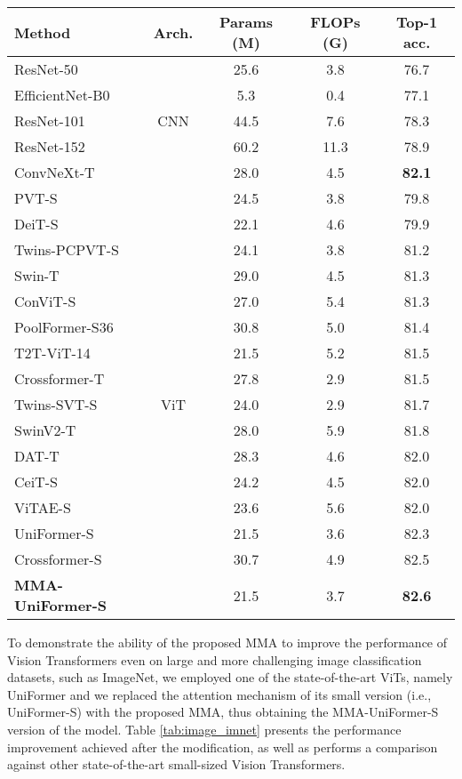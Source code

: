 \documentclass[10pt,twocolumn,letterpaper]{article}
\begin{document}
\begin{table*}[t]
\centering
\caption{Comparative evaluation on ImageNet with images of size $224\times224$.}
\label{tab:image_imnet}
\setlength{\tabcolsep}{24pt}
\begin{tabular}{lcccc}
\hline
\textbf{Method}  & \textbf{Arch.} & \textbf{Params (M)} & \textbf{FLOPs (G)} & \textbf{Top-1 acc.}\\
\hline
ResNet-50 \cite{Author61} & & 25.6 & 3.8 & 76.7 \\
EfficientNet-B0 \cite{Author39} & & 5.3 & 0.4 & 77.1 \\
ResNet-101 \cite{Author61} & CNN & 44.5 & 7.6 & 78.3 \\
ResNet-152 \cite{Author61} & & 60.2 & 11.3 & 78.9 \\
ConvNeXt-T \cite{Author62} & & 28.0 & 4.5 & \textbf{82.1} \\
\hline
PVT-S \cite{Author10} & & 24.5 & 3.8 & 79.8\\
DeiT-S \cite{Author4} & & 22.1 & 4.6 & 79.9\\
Twins-PCPVT-S \cite{Author66} & & 24.1 & 3.8 & 81.2\\
Swin-T \cite{Author9} & & 29.0 & 4.5 & 81.3\\
ConViT-S \cite{Author5} & & 27.0 & 5.4 & 81.3\\
PoolFormer-S36 \cite{Author63} & & 30.8 & 5.0 & 81.4\\
T2T-ViT-14 \cite{Author8} & & 21.5 & 5.2 & 81.5\\
Crossformer-T \cite{Author64} & & 27.8 & 2.9 & 81.5\\
Twins-SVT-S \cite{Author66} & ViT & 24.0 & 2.9 & 81.7\\
SwinV2-T \cite{Author65} & & 28.0 & 5.9 & 81.8\\
DAT-T \cite{Author67} & & 28.3 & 4.6 & 82.0\\
CeiT-S \cite{Author6} & & 24.2 & 4.5 & 82.0\\
ViTAE-S \cite{Author56} & & 23.6 & 5.6 & 82.0\\
UniFormer-S \cite{Author57} & & 21.5 & 3.6 & 82.3\\
Crossformer-S \cite{Author64} & & 30.7 & 4.9 & 82.5\\
\textbf{MMA-UniFormer-S} & & 21.5 & 3.7 & \textbf{82.6}\\
\hline
\end{tabular}
\end{table*}

To demonstrate the ability of the proposed MMA to improve the performance of Vision Transformers even on large and more challenging image classification datasets, such as ImageNet, we employed one of the state-of-the-art ViTs, namely UniFormer \cite{Author57} and we replaced the attention mechanism of its small version (i.e., UniFormer-S) with the proposed MMA, thus obtaining the MMA-UniFormer-S version of the model. Table \ref{tab:image_imnet} presents the performance improvement achieved after the modification, as well as performs a comparison against other state-of-the-art small-sized Vision Transformers.
\end{document}
